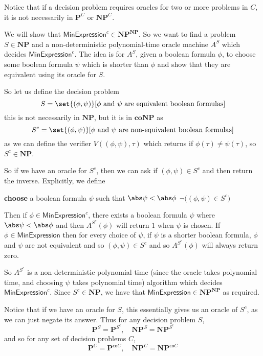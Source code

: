 \documentclass[10pt]{article}
\def\minexpr{\mathsf{MinExpression}}
\def\P{\mathbf{P}}
\def\NP{\mathbf{NP}}
\def\co{\mathsf{co}}
\def\coNP{\mathbf{coNP}}
\begin{document}
Notice that if a decision problem requires oracles for two or more problems in $C$, it is not necessarily in $\P^C$ or $\NP^C$.

\begin{exam*}

    We will show that $\minexpr^c\in\NP^\NP$.
    So we want to find a problem $S\in\NP$ and a non-deterministic polynomial-time oracle machine $A^S$ which decides $\minexpr^c$.
    The idea is for $A^S$, given a boolean formula $\phi$, to choose some boolean formula $\psi$ which is shorter than $\phi$ and show that they are equivalent using its oracle for $S$.

    So let us define the decision problem
    \[ S = \set{(\phi,\psi)}[\text{$\phi$ and $\psi$ are equivalent boolean formulas}] \]
    this is not necessarily in $\NP$, but it is in $\coNP$ as
    \[ S^c = \set{(\phi,\psi)}[\text{$\phi$ and $\psi$ are non-equivalent boolean formulas}] \]
    as we can define the verifier $V((\phi,\psi),\tau)$ which returns if $\phi(\tau)\neq\psi(\tau)$, so $S^c\in\NP$.

    So if we have an oracle for $S^c$, then we can ask if $(\phi,\psi)\in S^c$ and then return the inverse.
    Explicitly, we define

    \algorithm
            \State \textbf{choose} a boolean formula $\psi$ such that $\abs\psi<\abs\phi$
            \State \Return $\neg\bigl((\phi,\psi)\in S^c\bigr)$
        \EndFunc
    \ealgorithm

    Then if $\phi\in\minexpr^c$, there exists a boolean formula $\psi$ where $\abs\psi<\abs\phi$ and then $A^{S^c}(\phi)$ will return $1$ when $\psi$ is chosen.
    If $\phi\in\minexpr$ then for every choice of $\psi$, if $\psi$ is a shorter boolean formula, $\phi$ and $\psi$ are not equivalent and so $(\phi,\psi)\in S^c$ and so $A^{S^c}(\phi)$ will always return
    zero.

    So $A^{S^c}$ is a non-deterministic polynomial-time (since the oracle takes polynomial time, and choosing $\psi$ takes polynomial time) algorithm which decides $\minexpr^c$.
    Since $S^c\in\NP$, we have that $\minexpr\in\NP^\NP$ as required.

\end{exam*}

Notice that if we have an oracle for $S$, this essentially gives us an oracle of $S^c$, as we can just negate its answer.
Thus for any decision problem $S$,
\[ \P^S = \P^{S^c},\quad \NP^S = \NP^{S^c} \]
and so for any set of decision problems $C$,
\[ \P^C = \P^{\co C},\quad \NP^C = \NP^{\co C} \]
\end{document}
